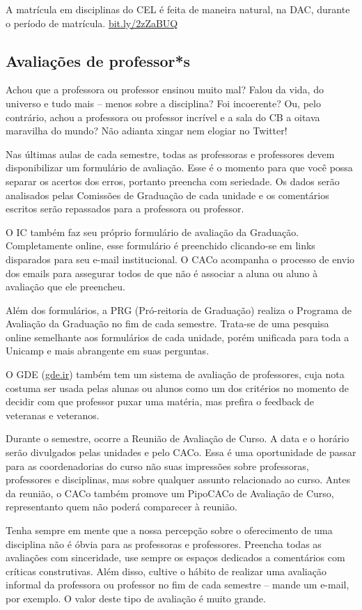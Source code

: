 A matrícula em disciplinas do CEL é feita de maneira natural, na DAC, durante o
período de matrícula. \url{bit.ly/2zZaBUQ}

\subsection{Avaliações de professor*s}

Achou que a professora ou professor ensinou muito mal? Falou da vida, do
universo e tudo mais -- menos sobre a disciplina? Foi incoerente? Ou, pelo
contrário, achou a professora ou professor incrível e a sala do CB a oitava
maravilha do mundo? Não adianta xingar nem elogiar no Twitter!

Nas últimas aulas de cada semestre, todas as professoras e professores devem
disponibilizar um formulário de avaliação. Esse é o momento para que você possa
separar os acertos dos erros, portanto preencha com seriedade. Os dados serão
analisados pelas Comissões de Graduação de cada unidade e os comentários
escritos serão repassados para a professora ou professor.

O IC também faz seu próprio formulário de avaliação da Graduação. Completamente
online, esse formulário é preenchido clicando-se em links disparados para seu
e-mail institucional. O CACo acompanha o processo de envio dos emails para
assegurar todos de que não é associar a aluna ou aluno à avaliação que ele
preencheu.

Além dos formulários, a PRG (Pró-reitoria de Graduação) realiza o Programa de
Avaliação da Graduação no fim de cada semestre. Trata-se de uma pesquisa
online semelhante aos formulários de cada unidade, porém unificada para toda a
Unicamp e mais abrangente em suas perguntas.

O GDE (\url{gde.ir}) também tem um sistema de avaliação de professores, cuja
nota costuma ser usada pelas alunas ou alunos como um dos critérios no momento
de decidir com que professor puxar uma matéria, mas prefira o feedback de
veteranas e veteranos.

Durante o semestre, ocorre a Reunião de Avaliação de Curso. A data e o horário
serão divulgados pelas unidades e pelo CACo. Essa é uma oportunidade de passar
para as coordenadorias do curso não suas impressões sobre professoras,
professores e disciplinas, mas sobre qualquer assunto relacionado ao curso.
Antes da reunião, o CACo também promove um PipoCACo de Avaliação de Curso,
representanto quem não poderá comparecer à reunião.

Tenha sempre em mente que a nossa percepção sobre o oferecimento de uma
disciplina não é óbvia para as professoras e professores. Preencha todas as
avaliações com sinceridade, use sempre os espaços dedicados a comentários com
críticas construtivas. Além disso, cultive o hábito de realizar uma avaliação
informal da professora ou professor no fim de cada semestre -- mande um e-mail,
por exemplo. O valor deste tipo de avaliação é muito grande.
